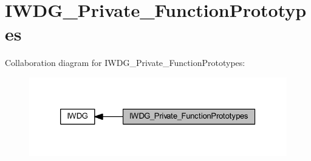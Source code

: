 \hypertarget{group___i_w_d_g___private___function_prototypes}{}\section{I\+W\+D\+G\+\_\+\+Private\+\_\+\+Function\+Prototypes}
\label{group___i_w_d_g___private___function_prototypes}
Collaboration diagram for I\+W\+D\+G\+\_\+\+Private\+\_\+\+Function\+Prototypes\+:
\nopagebreak
\begin{figure}[H]
\begin{center}
\leavevmode
\includegraphics[width=326pt]{group___i_w_d_g___private___function_prototypes}
\end{center}
\end{figure}
